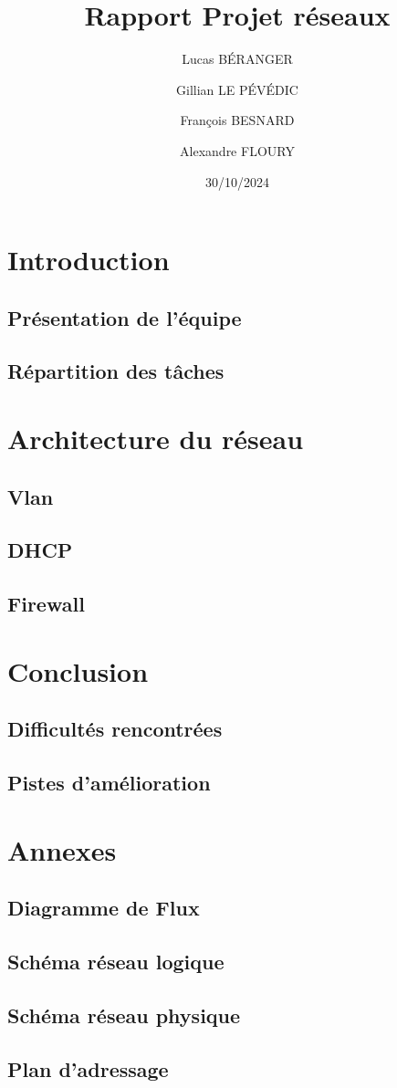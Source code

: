\documentclass[a4paper,12pt]{report}
\title{Rapport Projet réseaux}
\author{
    Lucas BÉRANGER \and
    Gillian LE PÉVÉDIC \and
    François BESNARD \and
    Alexandre FLOURY \and
}
\date{30/10/2024}
\begin{document}
    \maketitle  
    \newpage

    \tableofcontents
    \newpage

    \chapter{Introduction}
        \section{Présentation de l'équipe}
        \section{Répartition des tâches}


    \chapter{Architecture du réseau}
        \section{Vlan}
        \section{DHCP}
        \section{Firewall}
        \section{}


    \chapter{Conclusion}
        \section{Difficultés rencontrées}
        \section{Pistes d'amélioration}

    \chapter*{Annexes}
        \section{Diagramme de Flux}
        \section{Schéma réseau logique}
        \section{Schéma réseau physique}
        \section{Plan d'adressage}
        
\end{document}
